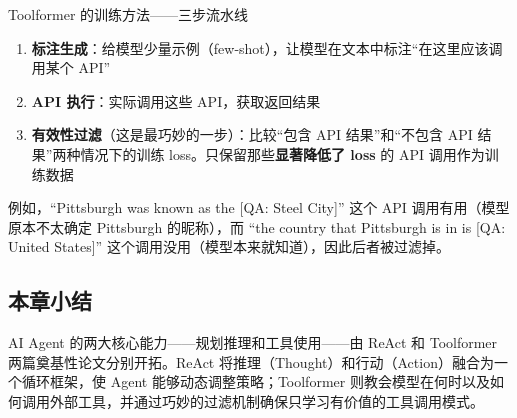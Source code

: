 \begin{knowledgebox}{Toolformer 的训练方法——三步流水线}
\begin{enumerate}
    \item \textbf{标注生成}：给模型少量示例（few-shot），让模型在文本中标注``在这里应该调用某个 API''
    \item \textbf{API 执行}：实际调用这些 API，获取返回结果
    \item \textbf{有效性过滤}（这是最巧妙的一步）：比较``包含 API 结果''和``不包含 API 结果''两种情况下的训练 loss。只保留那些\textbf{显著降低了 loss} 的 API 调用作为训练数据
\end{enumerate}
例如，``Pittsburgh was known as the {[}QA: Steel City{]}'' 这个 API 调用有用（模型原本不太确定 Pittsburgh 的昵称），而 ``the country that Pittsburgh is in is {[}QA: United States{]}'' 这个调用没用（模型本来就知道），因此后者被过滤掉。
\end{knowledgebox}

\subsection{本章小结}

AI Agent 的两大核心能力——规划推理和工具使用——由 ReAct 和 Toolformer 两篇奠基性论文分别开拓。ReAct 将推理（Thought）和行动（Action）融合为一个循环框架，使 Agent 能够动态调整策略；Toolformer 则教会模型在何时以及如何调用外部工具，并通过巧妙的过滤机制确保只学习有价值的工具调用模式。

